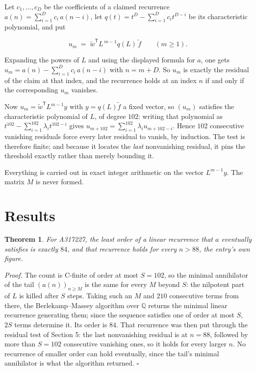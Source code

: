 \documentclass[11pt]{article}
\newtheorem{theorem}{Theorem}
\theoremstyle{definition}
\begin{document}
Let $c_1,\dots,c_D$ be the coefficients of a claimed recurrence $a(n) = \sum_{i=1}^{D} c_i\,a(n-i)$, let $q(t) = t^{D} - \sum_{i=1}^{D} c_i t^{D-i}$ be its characteristic polynomial, and put

\[u_m \;=\; \tilde w^{\mathsf T} L^{\,m-1} q(L)\,\tilde f \qquad (m \ge 1).\]

Expanding the powers of $L$ and using the displayed formula for $a$, one gets $u_m = a(n) - \sum_{i=1}^{D} c_i\,a(n-i)$ with $n = m + D$. So $u_m$ is exactly the residual of the claim at that index, and the recurrence holds at an index $n$ if and only if the corresponding $u_m$ vanishes.

Now $u_m = \tilde w^{\mathsf T} L^{m-1} y$ with $y = q(L)\tilde f$ a fixed vector, so $(u_m)$ satisfies the characteristic polynomial of $L$, of degree $102$: writing that polynomial as $t^{102} - \sum_{i=1}^{102} \lambda_i t^{102-i}$ gives $u_{m+102} = \sum_{i=1}^{102} \lambda_i u_{m+102-i}$. Hence $102$ consecutive vanishing residuals force every later residual to vanish, by induction. The test is therefore finite; and because it locates the {\itshape last} nonvanishing residual, it pins the threshold exactly rather than merely bounding it.

Everything is carried out in exact integer arithmetic on the vector $L^{m-1}y$. The matrix $M$ is never formed.

\section{Results}

\begin{theorem} For A317227, the least order of a linear recurrence that $a$ eventually satisfies is exactly $84$, and that recurrence holds for every $n > 88$, the entry's own figure.\end{theorem}

{\itshape Proof.} The count is C-finite of order at most $S = 102$, so the minimal annihilator of the tail $(a(n))_{n \ge M}$ is the same for every $M$ beyond $S$: the nilpotent part of $L$ is killed after $S$ steps. Taking such an $M$ and $210$ consecutive terms from there, the Berlekamp--Massey algorithm over $\mathbb{Q}$ returns the minimal linear recurrence generating them; since the sequence satisfies one of order at most $S$, $2S$ terms determine it. Its order is $84$. That recurrence was then put through the residual test of Section 5: the last nonvanishing residual is at $n = 88$, followed by more than $S = 102$ consecutive vanishing ones, so it holds for every larger $n$. No recurrence of smaller order can hold eventually, since the tail's minimal annihilator is what the algorithm returned. $\square$
\end{document}
